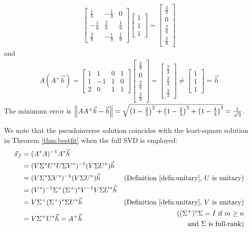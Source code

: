 \begin{solution}
\begin{align*}
\begin{bmatrix}
\frac{1}{3}&-\frac{1}{3}&0\\ 
-\frac{1}{9}&\frac{2}{9}&\frac{1}{9}\\ 
\frac{2}{9}&-\frac{1}{9}&\frac{1}{9}
\end{bmatrix}
\begin{bmatrix}
1 \\
1 \\
1
\end{bmatrix}  
=
\begin{bmatrix}
\frac{4}{9}\\ 
0\\ 
\frac{2}{9}\\ 
\frac{2}{9}
\end{bmatrix}
\end{align*}
and
\begin{align*}
A(A^+\vec{h}) = 
\begin{bmatrix}
1&1&0&1\\ 
1&-1&1&0\\ 
2&0&1&1
\end{bmatrix}
\begin{bmatrix}
\frac{4}{9}\\ 
0\\ 
\frac{2}{9}\\ 
\frac{2}{9}
\end{bmatrix}
=
\begin{bmatrix}
\frac{2}{3} \\
\frac{2}{3} \\
\frac{4}{3}
\end{bmatrix}
\neq 
\begin{bmatrix}
1 \\
1 \\
1
\end{bmatrix} 
= \vec{h}
\end{align*}
The minimum error is $\norm{AA^+\vec{h} - \vec{h}} = \sqrt{\left(1-\frac{2}{3}\right)^2 + \left(1-\frac{2}{3}\right)^2 + \left(1-\frac{4}{3}\right)^2} = \frac{1}{\sqrt{3}}$.
\end{solution}
We note that the pseudoinverse solution coincides with the least-square solution in Theorem \ref{thm:bestfit} when the full SVD is employed:
\begin{align*}
\vec{x}_f &= (A^* A)^{-1}A^* \vec{h} \\
&= (V \Sigma^* U^* U\Sigma V^*)^{-1} (V \Sigma U^*) \vec{h} \\
&= (V \Sigma^* \Sigma V^*)^{-1} (V \Sigma U^*) \vec{h} & \text{(Definition \ref{defn:unitary}, $U$ is unitary)} \\
&= (V^*)^{-1} \Sigma^+ (\Sigma^+)^* V^{-1} V \Sigma U^* \vec{h} \\
&= V \Sigma^+ (\Sigma^+)^* \Sigma U^* \vec{h} & \text{(Definition \ref{defn:unitary}, $V$ is unitary)} \\
&= V {\Sigma^+} U^* \vec{h} = A^+\vec{h} & 
\begin{aligned}
\text{($(\Sigma^+)^* \Sigma = I$ if $m \geq n$} \\ \text{and $\Sigma$ is full-rank)} 
\end{aligned}
\end{align*}
